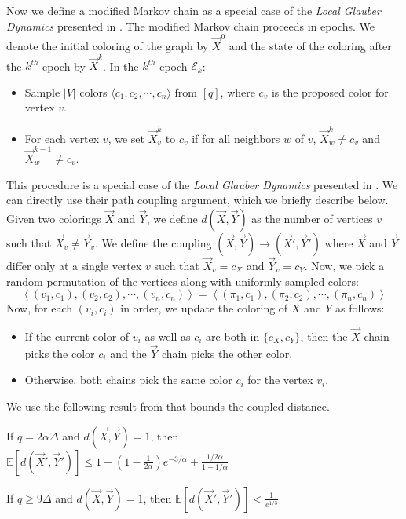 Now we define a modified Markov chain as a special case of the \emph{Local Glauber Dynamics} presented in \cite{mohsen}.
The modified Markov chain proceeds in epochs.
We denote the initial coloring of the graph by $\vec X^0$ and the state of the coloring after the $k^{th}$ epoch by $\vec X^k$.
In the $k^{th}$ epoch $\mathcal E_k$:
\begin{itemize}
    \item Sample $|V|$ colors $ \langle c_1, c_2,\cdots, c_n \rangle$ from $[q]$, where $c_v$ is the proposed color for vertex $v$.
    \item For each vertex $v$, we set $\vec X^k_v$ to $c_v$ if for all neighbors $w$ of $v$, $\vec X^k_w\not=c_v$ and $\vec X^{k-1}_w\not=c_v$.
\end{itemize}

This procedure is a special case of the \emph{Local Glauber Dynamics} presented in \cite{mohsen}.
We can directly use their path coupling argument, which we briefly describe below.
Given two colorings $\vec X$ and $\vec Y$, we define $d(\vec X,\vec Y)$ as the number of vertices $v$ such that $\vec X_v\not= \vec Y_v$.
We define the coupling $(\vec X,\vec Y)\rightarrow(\vec X',\vec Y')$ where $\vec X$ and $\vec Y$
differ only at a single vertex $v$ such that $\vec X_v = c_X$ and $\vec Y_v = c_Y$.
Now, we pick a random permutation of the vertices along with uniformly sampled colors:
\[
\left\langle (v_1, c_1), (v_2, c_2), \cdots, (v_n, c_n)\right\rangle
= \left\langle (\pi_1, c_1), (\pi_2, c_2), \cdots, (\pi_n, c_n)\right\rangle
\]
Now, for each $(v_i, c_i)$ in order, we update the coloring of $X$ and $Y$ as follows:
\begin{itemize}
    \item If the current color of $v_i$ as well as $c_i$ are both in $\{c_X,c_Y\}$,
    then the $\vec X$ chain picks the color $c_i$ and the $\vec Y$ chain picks the other color.
    \item Otherwise, both chains pick the same color $c_i$ for the vertex $v_i$.
\end{itemize}
We use the following result from \cite{mohsen} that bounds the coupled distance.
\begin{lemma}
\label{lem:mohsen_single_epoch_distance}
If $q = 2\alpha\Delta$ and $d(\vec X, \vec Y) = 1$,
then $\mathbb E[d(\vec X',\vec Y')] \le 1-\left( 1-\frac1{2\alpha}\right)e^{-3/\alpha} + \frac{1/2\alpha}{1-1/\alpha}$
\end{lemma}
\begin{corollary}
\label{cor:single_epoch_distansce}
If $q \ge 9\Delta$ and $d(\vec X, \vec Y) = 1$, then $\mathbb E[d(\vec X',\vec Y')] < \frac1{e^{1/3}}$
\end{corollary}

